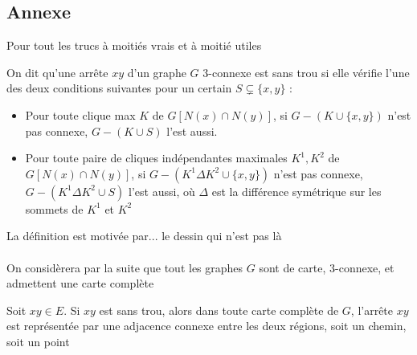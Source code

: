 \documentclass{scrartcl}
\begin{document}
\begin{flushleft}
\section*{Annexe}

Pour tout les trucs à moitiés vrais et à moitié utiles


\begin{def*}
    On dit qu'une arrête $xy$ d'un graphe $G$ $3$-connexe est sans trou si elle vérifie l'une des deux conditions suivantes pour un certain
    $S \subsetneq \{x, y\}$ :
    \begin{itemize}
        \item Pour toute clique max $K$ de $G[N(x) \cap N(y)]$, si $G - (K \cup \{x,y\})$ n'est pas connexe, $G - (K \cup S)$ l'est aussi.
        \item Pour toute paire de cliques indépendantes maximales $K^1, K^2$ de $G[N(x) \cap N(y)]$, si $G - (K^1 \Delta K^2 \cup \{x,y\})$ n'est pas connexe,
        $G - (K^1 \Delta K^2 \cup S)$ l'est aussi, où $\Delta$ est la différence symétrique sur les sommets de $K^1$ et $K^2$
    \end{itemize}
\end{def*}

La définition est motivée par... le dessin qui n'est pas là
\\~\\
On considèrera par la suite que tout les graphes $G$ sont de carte, $3$-connexe, et admettent une carte complète

\begin{lem}\label{contrSanstrou}
    Soit $xy \in E$. Si $xy$ est sans trou, alors dans toute carte complète de $G$, l'arrête $xy$ est représentée par une adjacence
    connexe entre les deux régions, soit un chemin, soit un point
\end{lem}


\end{flushleft}
\end{document}
